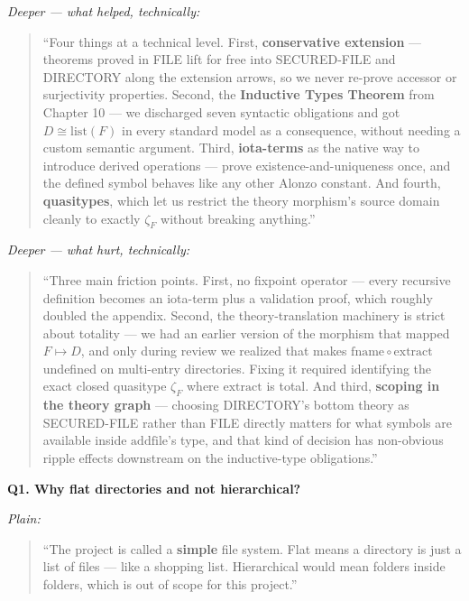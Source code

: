 \documentclass[12pt]{article}
\newenvironment{say}{%
  \par\medskip%
  \begin{quote}%
  \setlength{\parskip}{0.7em}%
  \large\itshape%
}{%
  \end{quote}%
  \medskip%
}
\begin{document}
\textit{\color{pauseclr}Deeper --- what helped, technically:}
\begin{say}
``Four things at a technical level. First, \textbf{conservative extension} --- theorems proved in FILE lift for free into SECURED-FILE and DIRECTORY along the extension arrows, so we never re-prove accessor or surjectivity properties. Second, the \textbf{Inductive Types Theorem} from Chapter 10 --- we discharged seven syntactic obligations and got $D \cong \mathrm{list}(F)$ in every standard model as a consequence, without needing a custom semantic argument. Third, \textbf{iota-terms} as the native way to introduce derived operations --- prove existence-and-uniqueness once, and the defined symbol behaves like any other Alonzo constant. And fourth, \textbf{quasitypes}, which let us restrict the theory morphism's source domain cleanly to exactly $\zeta_F$ without breaking anything.''
\end{say}

\textit{\color{pauseclr}Deeper --- what hurt, technically:}
\begin{say}
``Three main friction points. First, no fixpoint operator --- every recursive definition becomes an iota-term plus a validation proof, which roughly doubled the appendix. Second, the theory-translation machinery is strict about totality --- we had an earlier version of the morphism that mapped $F \mapsto D$, and only during review we realized that makes $\mathrm{fname}\circ\mathrm{extract}$ undefined on multi-entry directories. Fixing it required identifying the exact closed quasitype $\zeta_F$ where $\mathrm{extract}$ is total. And third, \textbf{scoping in the theory graph} --- choosing DIRECTORY's bottom theory as SECURED-FILE rather than FILE directly matters for what symbols are available inside $\mathrm{addfile}$'s type, and that kind of decision has non-obvious ripple effects downstream on the inductive-type obligations.''
\end{say}

\vspace{1em}

\textbf{\color{slidebar}Q1. Why flat directories and not hierarchical?}

\textit{\color{pauseclr}Plain:}
\begin{say}
``The project is called a \textbf{simple} file system. Flat means a directory is just a list of files --- like a shopping list. Hierarchical would mean folders inside folders, which is out of scope for this project.''
\end{say}
\end{document}
